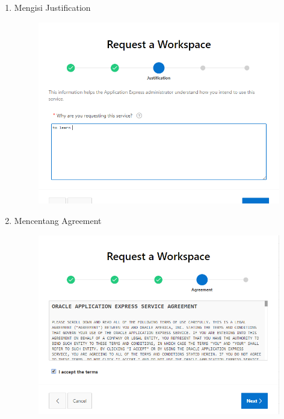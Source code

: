 \begin{enumerate}
	\item Mengisi Justification
	\begin{figure} [!htbp]
	\includegraphics[scale=0.2]{Apex/5.png}
	\centering
	\end{figure}
	
	\item Mencentang Agreement 
	\begin{figure} [!htbp]
	\includegraphics[scale=0.2]{Apex/6.png}
	\centering
	\end{figure}
	

\end{enumerate}
